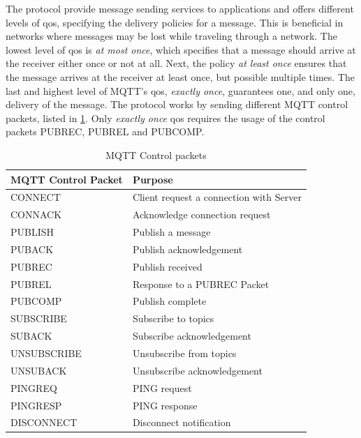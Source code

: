 The protocol provide message sending services to applications and offers
different levels of \gls{qos}, specifying the delivery policies for a message.
This is beneficial in networks where messages may be lost while traveling
through a network. The lowest level of \gls{qos} is \textit{at most once}, which
specifies that a message should arrive at the receiver either once or not at
all. Next, the policy \textit{at least once} ensures that the message arrives at
the receiver at least once, but possible multiple times. The last and highest
level of MQTT's \gls{qos}, \textit{exactly once}, guarantees one, and only one,
delivery of the message. The protocol works by sending different MQTT control
packets, listed in \cref{table:mqtt-packets}. Only \textit{exactly once}
\gls{qos} requires the usage of the control packets PUBREC, PUBREL and PUBCOMP.

\begin{table}[h]
\begin{tabularx}{\textwidth}{| X | X |}
\hline
  \textbf{MQTT Control Packet} & \textbf{Purpose} \\ \hline
  CONNECT & Client request a connection with Server \\ \hline
  CONNACK & Acknowledge connection request \\ \hline
  PUBLISH & Publish a message \\ \hline
  PUBACK & Publish acknowledgement \\ \hline
  PUBREC &  Publish received \\ \hline
  PUBREL & Response to a PUBREC Packet \\ \hline
  PUBCOMP & Publish complete \\ \hline
  SUBSCRIBE & Subscribe to topics \\ \hline
  SUBACK & Subscribe acknowledgement\\ \hline
  UNSUBSCRIBE & Unsubscribe from topics\\ \hline
  UNSUBACK & Unsubscribe acknowledgement \\ \hline
  PINGREQ & PING request \\ \hline
  PINGRESP & PING response \\ \hline
  DISCONNECT & Disconnect notification \\ \hline
\end{tabularx}
\caption{MQTT Control packets}
\label{table:mqtt-packets}
\end{table}


\subsection{}

